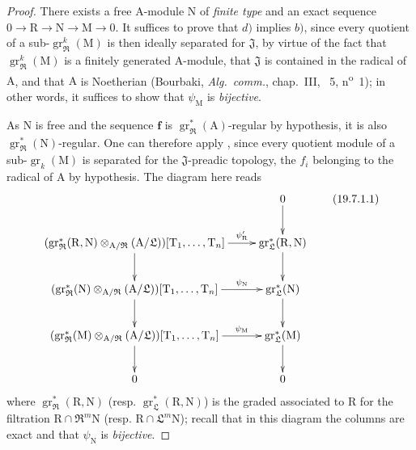 \begin{proof}
There exists a free $\mathrm{A}$-module $\mathrm{N}$ of \emph{finite type} and an exact sequence $0\to\mathrm{R}\to\mathrm{N}\to\mathrm{M}\to 0$. It suffices to prove that $d)$ implies $b)$, since every quotient of a sub-$\operatorname{gr}_\mathfrak{R}^k(\mathrm{M})$ is then ideally separated for $\mathfrak{J}$, by virtue of the fact that $\operatorname{gr}_\mathfrak{R}^k(\mathrm{M})$ is a finitely generated $\mathrm{A}$-module, that $\mathfrak{J}$ is contained in the radical of $\mathrm{A}$, and that $\mathrm{A}$ is Noetherian (Bourbaki, \emph{Alg.~comm.}, chap.~III, \textsection~5, n\textsuperscript{o}~1); in other words, it suffices to show that $\psi_\mathrm{M}$ is \emph{bijective}.

As $\mathrm{N}$ is free and the sequence $\mathbf{f}$ is $\operatorname{gr}_\mathfrak{R}^*(\mathrm{A})$-regular by hypothesis, it is also $\operatorname{gr}_\mathfrak{R}^*(\mathrm{N})$-regular. One can therefore apply , since every quotient module of a sub-$\operatorname{gr}_k(\mathrm{M})$ is separated for the $\mathfrak{J}$-preadic topology, the $f_i$ belonging to the radical of $\mathrm{A}$ by hypothesis. The diagram  here reads
\[
\xymatrix{
  & 0 \ar[d] \\
  (\operatorname{gr}_\mathfrak{R}^*(\mathrm{R},\mathrm{N})\otimes_{\mathrm{A}/\mathfrak{R}}(\mathrm{A}/\mathfrak{L}))[\mathrm{T}_1,\ldots,\mathrm{T}_n] \ar[r]^-{\psi_\mathrm{R}'} \ar[d] & \operatorname{gr}_\mathfrak{L}^*(\mathrm{R},\mathrm{N}) \ar[d] \\
  (\operatorname{gr}_\mathfrak{R}^*(\mathrm{N})\otimes_{\mathrm{A}/\mathfrak{R}}(\mathrm{A}/\mathfrak{L}))[\mathrm{T}_1,\ldots,\mathrm{T}_n] \ar[r]^-{\psi_\mathrm{N}} \ar[d] & \operatorname{gr}_\mathfrak{L}^*(\mathrm{N}) \ar[d] \\
  (\operatorname{gr}_\mathfrak{R}^*(\mathrm{M})\otimes_{\mathrm{A}/\mathfrak{R}}(\mathrm{A}/\mathfrak{L}))[\mathrm{T}_1,\ldots,\mathrm{T}_n] \ar[r]^-{\psi_\mathrm{M}} \ar[d] & \operatorname{gr}_\mathfrak{L}^*(\mathrm{M}) \ar[d] \\
  0 & 0
}
\tag{19.7.1.1}
\label{IV.19.7.1.1}
\]
where $\operatorname{gr}_\mathfrak{R}^*(\mathrm{R},\mathrm{N})$ (resp. $\operatorname{gr}_\mathfrak{L}^*(\mathrm{R},\mathrm{N})$) is the graded associated to $\mathrm{R}$ for the filtration $\mathrm{R}\cap\mathfrak{R}^m\mathrm{N}$ (resp. $\mathrm{R}\cap\mathfrak{L}^m\mathrm{N}$); recall that in this diagram the columns are exact and that $\psi_\mathrm{N}$ is \emph{bijective}.


\end{proof}
